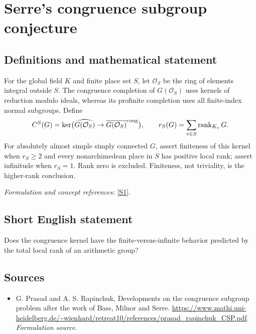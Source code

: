 \documentclass[11pt]{article}
\begin{document}
\section*{\texorpdfstring{Serre's congruence subgroup conjecture}{Serre's congruence subgroup conjecture}}\label{30006737}
\subsection{Definitions and mathematical statement}
For the global field $K$ and finite place set $S$, let $\mathcal O_S$ be the ring of elements integral outside $S$. The congruence completion of $G(\mathcal O_S)$ uses kernels of reduction modulo ideals, whereas its profinite completion uses all finite-index normal subgroups. Define
\[
 C^S(G)=\ker\bigl(\widehat{G(\mathcal O_S)}\to\overline{G(\mathcal O_S)}^{\rm cong}\bigr),
 \qquad r_S(G)=\sum_{v\in S}\operatorname{rank}_{K_v}G.
\]
For absolutely almost simple simply connected $G$, assert finiteness of this kernel when $r_S\ge2$ and every nonarchimedean place in $S$ has positive local rank; assert infinitude when $r_S=1$. Rank zero is excluded. Finiteness, not triviality, is the higher-rank conclusion.
\par\smallskip\textit{Formulation and concept references:} \href{https://www.mathi.uni-heidelberg.de/~wienhard/retreat10/references/prasad_rapinchuk_CSP.pdf}{[S1]}.

\subsection{Short English statement}
Does the congruence kernel have the finite-versus-infinite behavior predicted by the total local rank of an arithmetic group?
\subsection{Sources}
\begin{itemize}
\item[S1]G. Prasad and A. S. Rapinchuk, Developments on the congruence subgroup problem after the work of Bass, Milnor and Serre.
\url{https://www.mathi.uni-heidelberg.de/~wienhard/retreat10/references/prasad_rapinchuk_CSP.pdf}.
\textit{Formulation source.}
\end{itemize}
\end{document}
